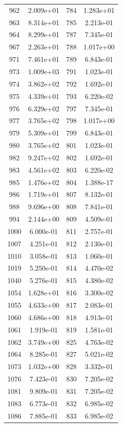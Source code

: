 \documentclass[12pt]{article}
\begin{document}
\begin{longtable}{@{}cccc@{}}
962 & 2.009e+01 & 784 & 1.283e+01 \\
963 & 8.314e+01 & 785 & 2.213e-01 \\
964 & 8.299e+01 & 787 & 7.345e-01 \\
967 & 2.263e+01 & 788 & 1.017e+00 \\
971 & 7.461e+01 & 789 & 6.843e-01 \\
973 & 1.009e+03 & 791 & 1.023e-01 \\
974 & 3.862e+02 & 792 & 1.692e-01 \\
975 & 4.339e+01 & 793 & 6.220e-02 \\
976 & 6.329e+02 & 797 & 7.345e-01 \\
977 & 3.765e+02 & 798 & 1.017e+00 \\
979 & 5.309e+01 & 799 & 6.843e-01 \\
980 & 3.765e+02 & 801 & 1.023e-01 \\
982 & 9.247e+02 & 802 & 1.692e-01 \\
983 & 4.561e+02 & 803 & 6.220e-02 \\
985 & 1.476e+02 & 804 & 1.388e-17 \\
986 & 1.719e+01 & 807 & 8.132e-01 \\
988 & 9.696e+00 & 808 & 7.841e-01 \\
994 & 2.144e+00 & 809 & 4.509e-01 \\
1000 & 6.000e-01 & 811 & 2.757e-01 \\
1007 & 4.251e-01 & 812 & 2.130e-01 \\
1010 & 3.058e-01 & 813 & 1.060e-01 \\
1019 & 5.250e-01 & 814 & 4.470e-02 \\
1040 & 5.276e-01 & 815 & 4.380e-02 \\
1054 & 1.628e+01 & 816 & 3.300e-02 \\
1055 & 4.633e+00 & 817 & 2.083e-01 \\
1060 & 4.686e+00 & 818 & 4.913e-01 \\
1061 & 1.919e-01 & 819 & 1.581e-01 \\
1062 & 3.749e+00 & 825 & 4.763e-02 \\
1064 & 8.285e-01 & 827 & 5.021e-02 \\
1073 & 1.032e+00 & 828 & 3.332e-01 \\
1076 & 7.423e-01 & 830 & 7.205e-02 \\
1081 & 9.809e-01 & 831 & 7.205e-02 \\
1083 & 6.773e-01 & 832 & 6.985e-02 \\
1086 & 7.885e-01 & 833 & 6.985e-02 \\

\end{longtable}
\end{document}

